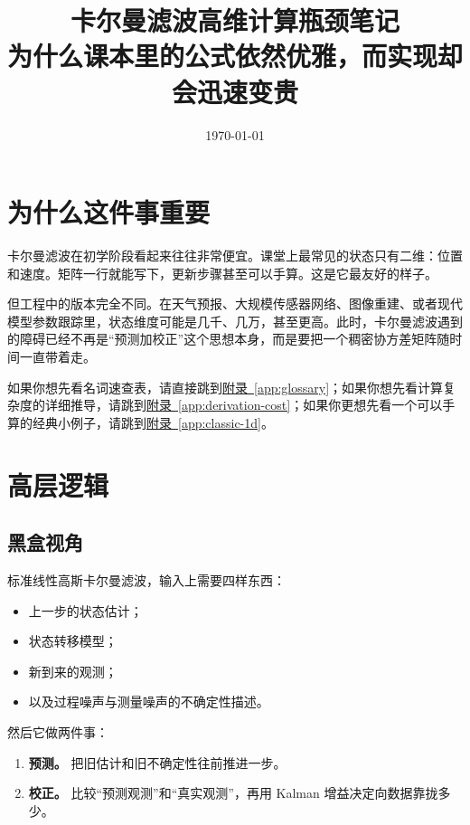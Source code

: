 \documentclass[12pt,a4paper]{ctexart}
\title{卡尔曼滤波高维计算瓶颈笔记\\
\large 为什么课本里的公式依然优雅，而实现却会迅速变贵}
\author{}
\date{\today}
\begin{document}
\maketitle
\tableofcontents

\section{为什么这件事重要}

卡尔曼滤波在初学阶段看起来往往非常便宜。课堂上最常见的状态只有二维：位置和速度。矩阵一行就能写下，更新步骤甚至可以手算。这是它最友好的样子。

但工程中的版本完全不同。在天气预报、大规模传感器网络、图像重建、或者现代模型参数跟踪里，状态维度可能是几千、几万，甚至更高。此时，卡尔曼滤波遇到的障碍已经不再是“预测加校正”这个思想本身，而是要把一个稠密协方差矩阵随时间一直带着走。

如果你想先看名词速查表，请直接跳到\hyperref[app:glossary]{附录~\ref*{app:glossary}}；如果你想先看计算复杂度的详细推导，请跳到\hyperref[app:derivation-cost]{附录~\ref*{app:derivation-cost}}；如果你更想先看一个可以手算的经典小例子，请跳到\hyperref[app:classic-1d]{附录~\ref*{app:classic-1d}}。


\section{高层逻辑}

\subsection{黑盒视角}

标准线性高斯卡尔曼滤波，输入上需要四样东西：
\begin{itemize}
  \item 上一步的状态估计；
  \item 状态转移模型；
  \item 新到来的观测；
  \item 以及过程噪声与测量噪声的不确定性描述。
\end{itemize}

然后它做两件事：
\begin{enumerate}
  \item \textbf{预测。} 把旧估计和旧不确定性往前推进一步。
  \item \textbf{校正。} 比较“预测观测”和“真实观测”，再用 Kalman 增益决定向数据靠拢多少。
\end{enumerate}
\end{document}
